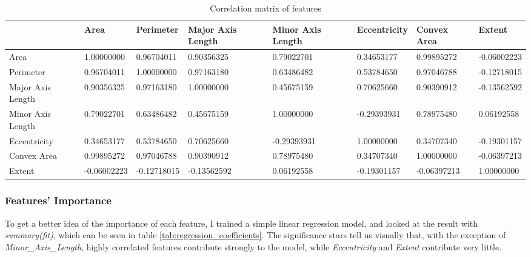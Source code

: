 \begin{table}
  \small
  \centering
  \caption{Correlation matrix of features}
  \label{tab:correlation_matrix_rice}
  \begin{tabularx}{\textwidth}{lXXXXXXX}
    \toprule 
     & Area & Perimeter & Major Axis Length & Minor Axis Length & Eccentricity & Convex Area & Extent \\
    \midrule
    Area              &  1.00000000 &  0.96704011 &  0.90356325 &  0.79022701 &  0.34653177 &  0.99895272 & -0.06002223 \\
    Perimeter         &  0.96704011 &  1.00000000 &  0.97163180 &  0.63486482 &  0.53784650 &  0.97046788 & -0.12718015 \\
    Major Axis Length &  0.90356325 &  0.97163180 &  1.00000000 &  0.45675159 &  0.70625660 &  0.90390912 & -0.13562592 \\
    Minor Axis Length &  0.79022701 &  0.63486482 &  0.45675159 &  1.00000000 & -0.29393931 &  0.78975480 &  0.06192558 \\
    Eccentricity      &  0.34653177 &  0.53784650 &  0.70625660 & -0.29393931 &  1.00000000 &  0.34707340 & -0.19301157 \\
    Convex Area       &  0.99895272 &  0.97046788 &  0.90390912 &  0.78975480 &  0.34707340 &  1.00000000 & -0.06397213 \\
    Extent            & -0.06002223 & -0.12718015 & -0.13562592 &  0.06192558 & -0.19301157 & -0.06397213 &  1.00000000 \\
    \bottomrule
  \end{tabularx}
\end{table}

\subsubsection{Features' Importance}

To get a better idea of the importance of each feature, I trained a simple linear regression model, and looked at the result with \textit{summary(fit)}, which can be seen in table \ref{tab:regression_coefficients}. The significance stars tell us visually that, with the exception of \textit{Minor\_Axis\_Length}, highly correlated features contribute strongly to the model, while \textit{Eccentricity} and \textit{Extent} contribute very little.

